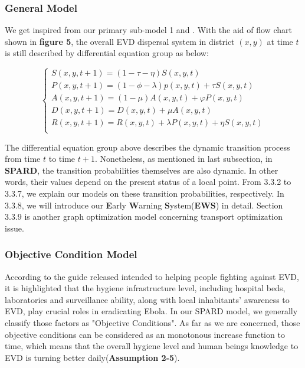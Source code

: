\subsubsection{General Model}
We get inspired from our primary sub-model 1 and \cite{shulgin1998pulse}. With the aid of flow chart shown in \textbf{figure 5}, the overall EVD dispersal system in district $(x,y)$ at time $t$ is still described by differential equation group as below:

\begin{equation}
 \left\{
\begin{aligned}
 S\left( x,y,t+1\right) =\left( 1-\tau -\eta \right) S\left( x,y,t\right) \\
 P\left( x,y,t+1\right) =(1-\phi-\lambda)p\left( x,y,t\right) +\tau S\left( x,y,t\right) \\
 A\left( x,y,t+1\right) =\left( 1-\mu \right) A\left( x,y,t\right) +\varphi P\left( x,y,t\right) \\
D\left( x,y,t+1\right) =D\left( x,y,t\right) +\mu A\left( x,y,t\right) \\
R\left( x,y,t+1\right) =R\left(x,y,t\right)+\lambda P\left( x,y,t\right) +\eta S\left( x,y,t\right) \\
\end{aligned}
\right.
\end{equation}

The differential equation group above describes the dynamic transition process from time $t$ to time $t+1$. Nonetheless, as mentioned in last subsection, in \textbf{SPARD}, the transition probabilities themselves are also dynamic. In other words, their values depend on the present status of a local point. From 3.3.2 to 3.3.7, we explain our models on these transition probabilities, respectively. In 3.3.8, we will introduce our \textbf{E}arly \textbf{W}arning \textbf{S}ystem(\textbf{EWS}) in detail. Section 3.3.9 is another graph optimization  model concerning transport optimization issue.

\subsubsection{Objective Condition Model}
According to the guide released intended to helping people fighting against EVD\cite{gradon2000outbreak}, it is highlighted that the hygiene infrastructure level, including hospital beds, laboratories and surveillance ability, along with local  inhabitants' awareness to EVD, play crucial roles in eradicating Ebola. In our SPARD model, we generally classify those factors as "Objective Conditions". As far as we are concerned, those objective conditions can be considered as an monotonous increase function to time, which means that the overall hygiene level and human beings knowledge to EVD is turning better daily(\textbf{Assumption 2-5}). 

